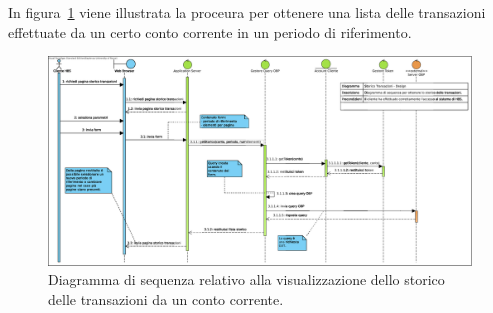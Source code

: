 In figura~\ref{fig:sequenza:storico} viene illustrata la proceura per ottenere una lista delle transazioni effettuate da un certo conto corrente in un periodo di riferimento.

\begin{figure}[h]
    \centering
	\includegraphics[width=\textheight, angle=90]{Images/Storico_Transazioni_-_Design.eps}
    \caption{Diagramma di sequenza relativo alla visualizzazione dello storico delle transazioni da un conto corrente.}
    \label{fig:sequenza:storico}
\end{figure}



